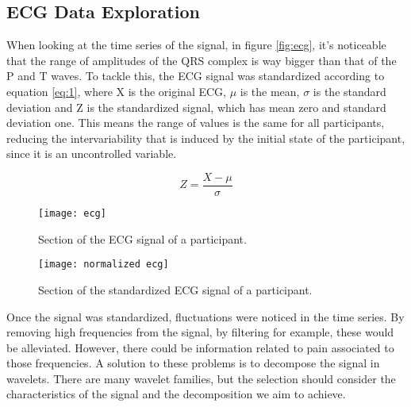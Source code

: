 

\subsection{ECG Data Exploration}
When looking at the time series of the signal, in figure \ref{fig:ecg}, it's noticeable that the range of amplitudes of the QRS complex is way bigger than that of the P and T waves.
To tackle this, the ECG signal was standardized according to equation \ref{eq:1}, where X is the original ECG, $\mu$ is the mean, $\sigma$ is the standard deviation and Z is the standardized signal, which has mean zero and standard deviation one. 
This means the range of values is the same for all participants, reducing the intervariability that is induced by the initial state of the participant, since it is an uncontrolled variable.

\begin{equation} \label{eq:1}
Z = \frac{X-\mu}{\sigma}
\end{equation}


\begin{figure}[htbp]
    \centering
    \begin{minipage}{0.45\textwidth}
        \centering
        \texttt{[image: ecg]}
        \caption{Section of the ECG signal of a participant.}
        \label{fig:ecg}
    \end{minipage}
    \hfill
    \begin{minipage}{0.45\textwidth}
        \centering
        \texttt{[image: normalized ecg]}
        \caption{Section of the standardized ECG signal of a participant.}
        \label{fig:normalized_ecg}
    \end{minipage}
\end{figure}

Once the signal was standardized, fluctuations were noticed in the time series.
By removing high frequencies from the signal, by filtering for example, these would be alleviated.
However, there could be information related to pain associated to those frequencies.
A solution to these problems is to decompose the signal in wavelets. There are many wavelet families, but the selection should consider the characteristics of the signal and the decomposition we aim to achieve.

